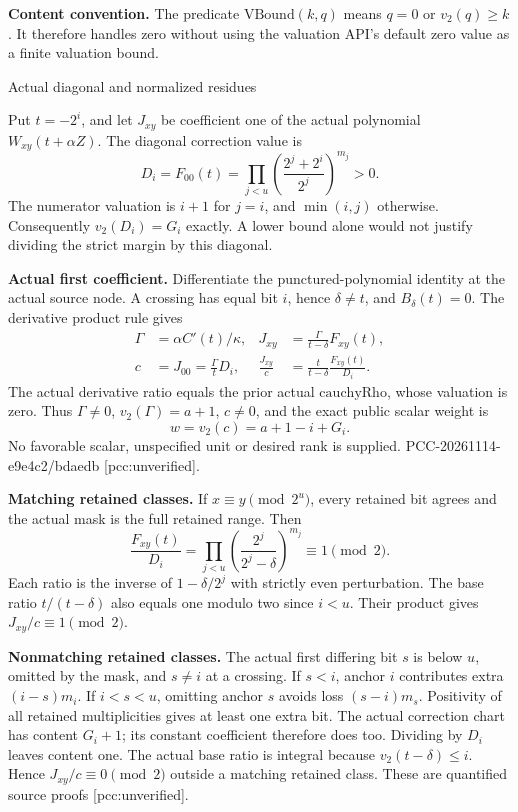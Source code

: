 \documentclass[10pt]{article}
\begin{document}
\textbf{Content convention.} The predicate $\mathrm{VBound}(k,q)$ means
$q=0$ or $v_2(q)\ge k$. It therefore handles zero without using the valuation
API's default zero value as a finite valuation bound.

\newpage
\begin{center}{\Large Actual diagonal and normalized residues}\end{center}

Put $t=-2^i$, and let $J_{xy}$ be coefficient one of the actual polynomial
$W_{xy}(t+\alpha Z)$. The diagonal correction value is
\[
D_i=F_{00}(t)=\prod_{j<u}\left(\frac{2^j+2^i}{2^j}\right)^{m_j}>0.
\]
The numerator valuation is $i+1$ for $j=i$, and $\min(i,j)$ otherwise.
Consequently $v_2(D_i)=G_i$ exactly. A lower bound alone would not justify
dividing the strict margin by this diagonal.

\textbf{Actual first coefficient.} Differentiate the punctured-polynomial
identity at the actual source node. A crossing has equal bit $i$, hence
$\delta\ne t$, and $B_\delta(t)=0$. The derivative product rule gives
\begin{align*}
\Gamma&=\alpha C'(t)/\kappa,&
J_{xy}&=\frac{\Gamma}{t-\delta}F_{xy}(t),\\
c&=J_{00}=\frac{\Gamma}{t}D_i,&
\frac{J_{xy}}{c}&=\frac{t}{t-\delta}\frac{F_{xy}(t)}{D_i}.
\end{align*}
The actual derivative ratio equals the prior actual $\mathrm{cauchyRho}$,
whose valuation is zero. Thus $\Gamma\ne0$, $v_2(\Gamma)=a+1$, $c\ne0$,
and the exact public scalar weight is
\[
w=v_2(c)=a+1-i+G_i.
\]
No favorable scalar, unspecified unit or desired rank is supplied.
PCC-20261114-e9e4c2/bdaedb [pcc:unverified].

\textbf{Matching retained classes.} If $x\equiv y\pmod{2^u}$, every
retained bit agrees and the actual mask is the full retained range. Then
\[
\frac{F_{xy}(t)}{D_i}=\prod_{j<u}
 \left(\frac{2^j}{2^j-\delta}\right)^{m_j}\equiv1\pmod2.
\]
Each ratio is the inverse of $1-\delta/2^j$ with strictly even perturbation.
The base ratio $t/(t-\delta)$ also equals one modulo two since $i<u$.
Their product gives $J_{xy}/c\equiv1\pmod2$.

\textbf{Nonmatching retained classes.} The actual first differing bit $s$
is below $u$, omitted by the mask, and $s\ne i$ at a crossing. If $s<i$,
anchor $i$ contributes extra $(i-s)m_i$. If $i<s<u$, omitting anchor $s$
avoids loss $(s-i)m_s$. Positivity of all retained multiplicities gives at
least one extra bit. The actual correction chart has content $G_i+1$;
its constant coefficient therefore does too. Dividing by $D_i$ leaves
content one. The actual base ratio is integral because
$v_2(t-\delta)\le i$. Hence $J_{xy}/c\equiv0\pmod2$ outside a matching
retained class. These are quantified source proofs [pcc:unverified].
\end{document}
